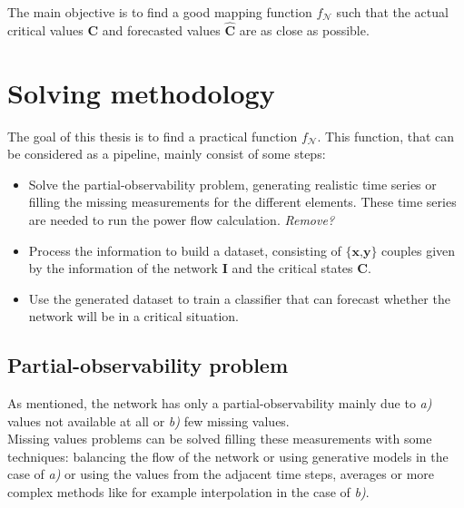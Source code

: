 
The main objective is to find a good mapping function $f_\mathcal{N}$ such that the actual critical values $\textbf{C}$ and forecasted values $\hat{\textbf{C}}$ are as close as possible.

\section{Solving methodology}
\label{sec:sm}
The goal of this thesis is to find a practical function $f_\mathcal{N}$. This function, that can be considered as a pipeline, mainly consist of some steps:
\begin{itemize}
    \item Solve the partial-observability problem, generating realistic time series or filling the missing measurements for the different elements. These time series are needed to run the power flow calculation. \emph{Remove?}
    \item Process the information to build a dataset, consisting of $\{\textbf{x,y}\}$ couples given by the information of the network $\textbf{I}$ and the critical states $\textbf{C}$.
    \item Use the generated dataset to train a classifier that can forecast whether the network will be in a critical situation.
\end{itemize}

\subsection{Partial-observability problem}
As mentioned, the network has only a partial-observability mainly due to \emph{a)} values not available at all or \emph{b)} few missing values. \\

Missing values problems can be solved filling these measurements with some techniques: balancing the flow of the network or using generative models in the case of \emph{a)} or using the values from the adjacent time steps, averages or more complex methods like for example interpolation in the case of \emph{b)}. \\


